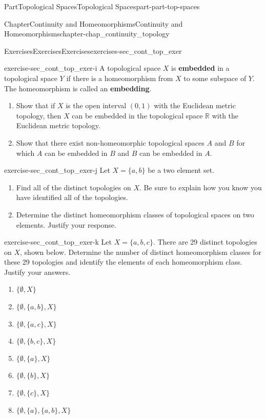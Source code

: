 \documentclass[oneside,10pt,]{book}
\newcommand{\terminology}[1]{\textbf{#1}}
\numberwithin{equation}{chapter}
\newcommand{\R}{\mathbb{R}}
\begin{document}
\begin{partptx}{Part}{Topological Spaces}{}{Topological Spaces}{}{}{part-part-top-spaces}
\begin{chapterptx}{Chapter}{Continuity and Homeomorphisms}{}{Continuity and Homeomorphisms}{}{}{chapter-chap_continuity_topology}
\begin{exercises-section}{Exercises}{Exercises}{}{Exercises}{}{}{exercises-sec_cont_top_exer}
\begin{divisionexercise}{9}{}{}{exercise-sec_cont_top_exer-i}
A topological space \(X\) is \terminology{embedded} in a topological space \(Y\) if there is a homeomorphism from \(X\) to some subspace of \(Y\). The homeomorphism is called an \terminology{embedding}.%
\begin{enumerate}[font=\bfseries,label=(\alph*),ref=\alph*]%
\item{}Show that if \(X\) is the open interval \((0,1)\) with the Euclidean metric topology, then \(X\) can be embedded in the topological space \(\R\) with the Euclidean metric topology.%
\item{}Show that there exist non-homeomorphic topological spaces \(A\) and \(B\) for which \(A\) can be embedded in \(B\) and \(B\) can be embedded in \(A\).%
\end{enumerate}%
\end{divisionexercise}%
\begin{divisionexercise}{10}{}{}{exercise-sec_cont_top_exer-j}%
Let \(X = \{a,b\}\) be a two element set.%
\begin{enumerate}[font=\bfseries,label=(\alph*),ref=\alph*]%
\item{}Find all of the distinct topologies on \(X\). Be sure to explain how you know you have identified all of the topologies.%
\item{}Determine the distinct homeomorphism classes of topological spaces on two elements. Justify your response.%
\end{enumerate}%
\end{divisionexercise}%
\begin{divisionexercise}{11}{}{}{exercise-sec_cont_top_exer-k}%
Let \(X = \{a,b,c\}\). There are 29 distinct topologies on \(X\), shown below. Determine the number of distinct homeomorphism classes for these 29 topologies and identify the elements of each homeomorphism class. Justify your answers.%
\begin{enumerate}[font=\bfseries,label=(\alph*),ref=\alph*]%
\item{}\(\{\emptyset, X\}\)%
\item{}\(\{\emptyset, \{a,b\}, X\}\)%
\item{}\(\{\emptyset, \{a,c\}, X\}\)%
\item{}\(\{\emptyset, \{b,c\}, X\}\)%
\item{}\(\{\emptyset, \{a\}, X\}\)%
\item{}\(\{\emptyset, \{b\}, X\}\)%
\item{}\(\{\emptyset, \{c\}, X\}\)%
\item{}\(\{\emptyset, \{a\}, \{a,b\}, X\}\)%

\end{enumerate}
\end{divisionexercise}
\end{exercises-section}
\end{chapterptx}
\end{partptx}
\end{document}
